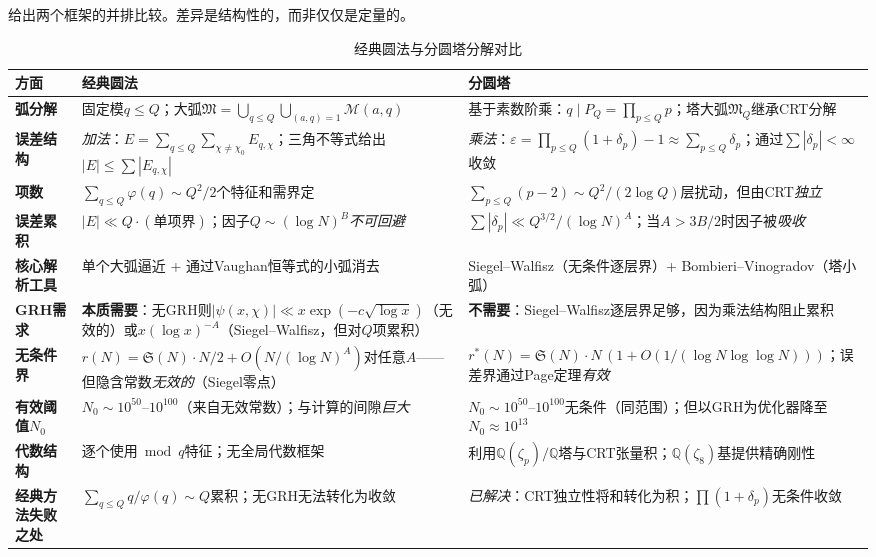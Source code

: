 \documentclass[11pt,a4paper]{article}
\theoremstyle{remark}
\newcommand{\Q}{\mathbb{Q}}
\newcommand{\mM}{\mathfrak{M}}
\begin{document}
给出两个框架的并排比较。差异是结构性的，而非仅仅是定量的。

\begin{table}[ht]
\centering
\caption{经典圆法与分圆塔分解对比}
\label{tab:comparison}
\small
\renewcommand{\arraystretch}{1.35}
\begin{tabular}{@{}p{3.2cm}|p{5.0cm}|p{5.0cm}@{}}
\toprule
\textbf{方面} & \textbf{经典圆法} & \textbf{分圆塔} \\
\midrule

\textbf{弧分解}
  & 固定模$q \leq Q$；大弧$\mM = \bigcup_{q \leq Q}\bigcup_{(a,q)=1} \mathcal{M}(a,q)$
  & 基于素数阶乘：$q \mid P_Q = \prod_{p \leq Q}p$；塔大弧$\mM_Q$继承CRT分解 \\

\textbf{误差结构}
  & \emph{加法}：$E = \sum_{q \leq Q}\sum_{\chi \neq \chi_0} E_{q,\chi}$；三角不等式给出$|E| \leq \sum |E_{q,\chi}|$
  & \emph{乘法}：$\varepsilon = \prod_{p \leq Q}(1+\delta_p) - 1 \approx \sum_{p \leq Q}\delta_p$；通过$\sum|\delta_p| < \infty$收敛 \\

\textbf{项数}
  & $\sum_{q \leq Q}\varphi(q) \sim Q^2/2$个特征和需界定
  & $\sum_{p \leq Q}(p-2) \sim Q^2/(2\log Q)$层扰动，但由CRT\emph{独立} \\

\textbf{误差累积}
  & $|E| \ll Q \cdot (\text{单项界})$；因子$Q \sim (\log N)^B$\emph{不可回避}
  & $\sum|\delta_p| \ll Q^{3/2}/(\log N)^A$；当$A > 3B/2$时因子被\emph{吸收} \\

\textbf{核心解析工具}
  & 单个大弧逼近 + 通过Vaughan恒等式的小弧消去
  & Siegel--Walfisz（无条件逐层界）+ Bombieri--Vinogradov（塔小弧） \\

\textbf{GRH需求}
  & \textbf{本质需要}：无GRH则$|\psi(x,\chi)| \ll x\exp(-c\sqrt{\log x})$（无效的）或$x(\log x)^{-A}$（Siegel--Walfisz，但对$Q$项累积）
  & \textbf{不需要}：Siegel--Walfisz逐层界足够，因为乘法结构阻止累积 \\

\textbf{无条件界}
  & $r(N) = \mathfrak{S}(N)\cdot N/2 + O(N/(\log N)^A)$对任意$A$——但隐含常数\emph{无效的}（Siegel零点）
  & $r^*(N) = \mathfrak{S}(N)\cdot N\,(1 + O(1/(\log N\log\log N)))$；误差界通过Page定理\emph{有效} \\

\textbf{有效阈值$N_0$}
  & $N_0 \sim 10^{50}$--$10^{100}$（来自无效常数）；与计算的间隙\emph{巨大}
  & $N_0 \sim 10^{50}$--$10^{100}$无条件（同范围）；但以GRH为优化器降至$N_0 \approx 10^{13}$ \\

\textbf{代数结构}
  & 逐个使用$\bmod q$特征；无全局代数框架
  & 利用$\Q(\zeta_p)/\Q$塔与CRT张量积；$\Q(\zeta_8)$基提供精确刚性 \\

\textbf{经典方法失败之处}
  & $\sum_{q \leq Q} q/\varphi(q) \sim Q$累积；无GRH无法转化为收敛
  & \emph{已解决}：CRT独立性将和转化为积；$\prod(1+\delta_p)$无条件收敛 \\

\bottomrule
\end{tabular}
\end{table}
\end{document}

